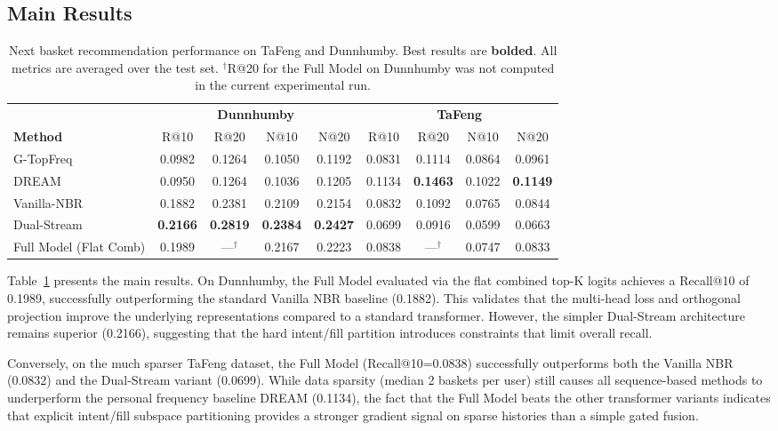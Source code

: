 \documentclass[conference]{IEEEtran}
\begin{document}
\subsection{Main Results}

\begin{table}[t]
\centering
\caption{Next basket recommendation performance on TaFeng and Dunnhumby. Best results are \textbf{bolded}. All metrics are averaged over the test set. $^\dagger$R@20 for the Full Model on Dunnhumby was not computed in the current experimental run.}
\label{tab:main_results}
\begin{tabular}{l|cccc|cccc}
\toprule
& \multicolumn{4}{c|}{\textbf{Dunnhumby}} & \multicolumn{4}{c}{\textbf{TaFeng}} \\
\textbf{Method} & R@10 & R@20 & N@10 & N@20 & R@10 & R@20 & N@10 & N@20 \\
\midrule
G-TopFreq       & 0.0982 & 0.1264 & 0.1050 & 0.1192 & 0.0831 & 0.1114 & 0.0864 & 0.0961 \\
DREAM           & 0.0950 & 0.1264 & 0.1036 & 0.1205 & 0.1134 & \textbf{0.1463} & 0.1022 & \textbf{0.1149} \\
\midrule
Vanilla-NBR     & 0.1882 & 0.2381 & 0.2109 & 0.2154 & 0.0832 & 0.1092 & 0.0765 & 0.0844 \\
Dual-Stream     & \textbf{0.2166} & \textbf{0.2819} & \textbf{0.2384} & \textbf{0.2427} & 0.0699 & 0.0916 & 0.0599 & 0.0663 \\
Full Model (Flat Comb) & 0.1989 & ---$^\dagger$ & 0.2167 & 0.2223 & 0.0838 & ---$^\dagger$ & 0.0747 & 0.0833 \\
\bottomrule
\end{tabular}
\end{table}

Table~\ref{tab:main_results} presents the main results. On Dunnhumby, the Full Model evaluated via the flat combined top-K logits achieves a Recall@10 of 0.1989, successfully outperforming the standard Vanilla NBR baseline (0.1882). This validates that the multi-head loss and orthogonal projection improve the underlying representations compared to a standard transformer. However, the simpler Dual-Stream architecture remains superior (0.2166), suggesting that the hard intent/fill partition introduces constraints that limit overall recall.

Conversely, on the much sparser TaFeng dataset, the Full Model (Recall@10=0.0838) successfully outperforms both the Vanilla NBR (0.0832) and the Dual-Stream variant (0.0699). While data sparsity (median 2 baskets per user) still causes all sequence-based methods to underperform the personal frequency baseline DREAM (0.1134), the fact that the Full Model beats the other transformer variants indicates that explicit intent/fill subspace partitioning provides a stronger gradient signal on sparse histories than a simple gated fusion.
\end{document}
